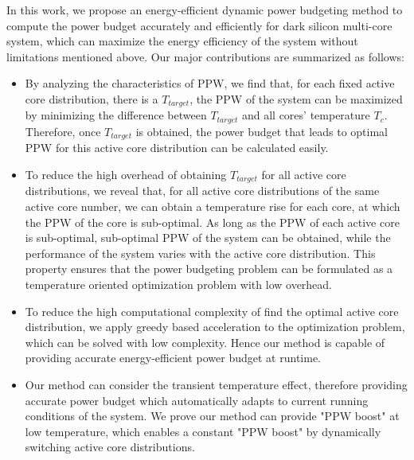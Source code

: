 In this work, we propose an energy-efficient dynamic power budgeting method to compute the power budget accurately and efficiently for dark silicon multi-core system, which can maximize the energy efficiency of the system without limitations mentioned above. Our major contributions are summarized as follows:
\begin{itemize}

\item By analyzing the characteristics of PPW, we find that, for each fixed active core distribution, there is a $T_{target}$, the PPW of the system can be maximized by minimizing the difference between $T_{target}$ and all cores' temperature $T_{c}$. Therefore, once $T_{target}$ is obtained, the power budget that leads to optimal PPW for this active core distribution can be calculated easily.
\item To reduce the high overhead of obtaining $T_{target}$ for all active core distributions, we reveal that, for all active core distributions of the same active core number, we can obtain a temperature rise for each core, at which the PPW of the core is sub-optimal. As long as the PPW of each active core is sub-optimal, sub-optimal PPW of the system can be obtained, while the performance of the system varies with the active core distribution.
This property ensures that the power budgeting problem can be formulated as a temperature oriented optimization problem with low overhead.
\item To reduce the high computational complexity of find the optimal active core distribution, we apply greedy based acceleration to the optimization problem, which can be solved with low complexity. Hence our method is capable of providing accurate energy-efficient power budget at runtime.
\item Our method can consider the transient temperature effect, therefore providing accurate power budget which automatically adapts to current running conditions of the system. We prove our method can provide "PPW boost" at low temperature, which enables a constant "PPW boost" by dynamically switching active core distributions.
\end{itemize} 